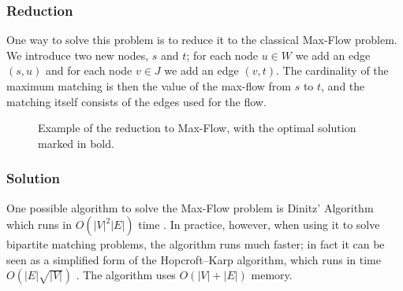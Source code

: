 \documentclass[a4,11pt]{article}
\begin{document}
\subsubsection{Reduction}
One way to solve this problem is to reduce it to the classical Max-Flow problem. We introduce two new nodes, $s$ and $t$; for each node $u \in W$ we add an edge $(s, u)$ and for each node $v \in J$ we add an edge $(v, t)$. The cardinality of the maximum matching is then the value of the max-flow from $s$ to $t$, and the matching itself consists of the edges used for the flow.

\begin{figure}[ht]
    \centering
    \caption{Example of the reduction to Max-Flow, with the optimal solution marked in bold.}
\end{figure}

\subsubsection{Solution} \label{dinic}
One possible algorithm to solve the Max-Flow problem is Dinitz’ Algorithm which runs in $O(\left|V\right|^2 \left|E\right|)$ time \cite{schrijver_combinatorial_2013}. In practice, however, when using it to solve bipartite matching problems, the algorithm runs much faster; in fact it can be seen as a simplified form of the Hopcroft–Karp algorithm, which runs in time $O(\left|E\right|\sqrt{\left|V\right|})$ \cite{schrijver_combinatorial_2013}. The algorithm uses $O(\left|V\right| + \left|E\right|)$ memory.
\end{document}
